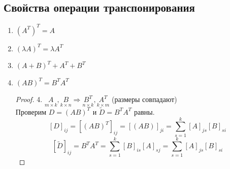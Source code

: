 \documentclass[a4paper, 12pt]{article}
\theoremstyle{definition}
\begin{document}
  \subsection{Свойства операции транспонирования}
  \begin{enumerate}
    \item $(A^T)^T = A$
    \item $(\lambda A)^T = \lambda A^T$
    \item $(A+B)^T + A^T + B^T$
    \item $(AB)^T = B^TA^T$   
    \begin{proof}
      4. $\underset{m \times k}{A}, \underset{k \times n}{B} \Longrightarrow \underset{n \times k}{B^T}, \underset{k \times m}{A^T}$ (размеры совпадают) \\
      Проверим $D = (AB)^T \text{ и } \widetilde{D} = B^TA^T$ равны.
      $$[D]_{ij} = [(AB)^T]_{ij} = [(AB)]_{ji} = \sum \limits_{s=1}^k[A]_{js}[B]_{si}$$ 
      $$[\widetilde{D}]_{ij} = B^TA^T = \sum \limits_{s=1}^k[B]_{is}[A]_{sj} = \sum \limits_{s=1}^k[A]_{js}[B]_{si}$$ 
    \end{proof} 
  \end{enumerate}
\end{document}
